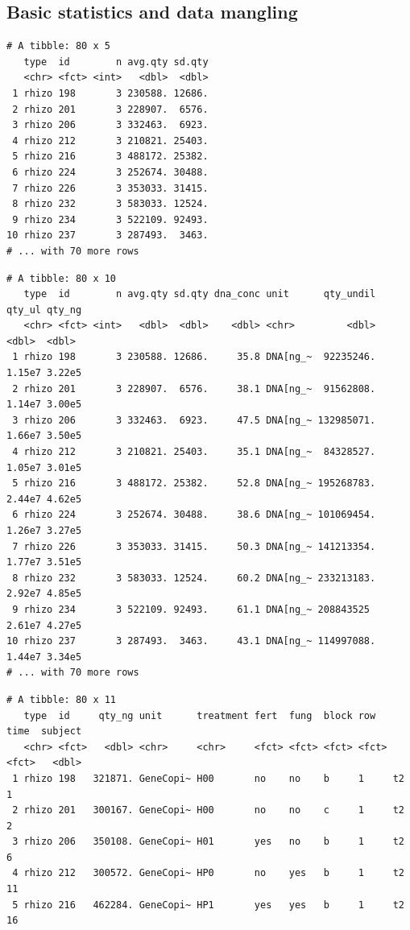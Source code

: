 \documentclass[twoside,12pt,final]{ucthesis-CA2012}
\begin{document}
\begin{ucmainmatter}
{\chapter{Basic statistics and data mangling}\label{basic-statistics-and-data-mangling}}
\begin{verbatim}
# A tibble: 80 x 5
   type  id        n avg.qty sd.qty
   <chr> <fct> <int>   <dbl>  <dbl>
 1 rhizo 198       3 230588. 12686.
 2 rhizo 201       3 228907.  6576.
 3 rhizo 206       3 332463.  6923.
 4 rhizo 212       3 210821. 25403.
 5 rhizo 216       3 488172. 25382.
 6 rhizo 224       3 252674. 30488.
 7 rhizo 226       3 353033. 31415.
 8 rhizo 232       3 583033. 12524.
 9 rhizo 234       3 522109. 92493.
10 rhizo 237       3 287493.  3463.
# ... with 70 more rows
\end{verbatim}
\begin{verbatim}
# A tibble: 80 x 10
   type  id        n avg.qty sd.qty dna_conc unit      qty_undil   qty_ul qty_ng
   <chr> <fct> <int>   <dbl>  <dbl>    <dbl> <chr>         <dbl>    <dbl>  <dbl>
 1 rhizo 198       3 230588. 12686.     35.8 DNA[ng_~  92235246.   1.15e7 3.22e5
 2 rhizo 201       3 228907.  6576.     38.1 DNA[ng_~  91562808.   1.14e7 3.00e5
 3 rhizo 206       3 332463.  6923.     47.5 DNA[ng_~ 132985071.   1.66e7 3.50e5
 4 rhizo 212       3 210821. 25403.     35.1 DNA[ng_~  84328527.   1.05e7 3.01e5
 5 rhizo 216       3 488172. 25382.     52.8 DNA[ng_~ 195268783.   2.44e7 4.62e5
 6 rhizo 224       3 252674. 30488.     38.6 DNA[ng_~ 101069454.   1.26e7 3.27e5
 7 rhizo 226       3 353033. 31415.     50.3 DNA[ng_~ 141213354.   1.77e7 3.51e5
 8 rhizo 232       3 583033. 12524.     60.2 DNA[ng_~ 233213183.   2.92e7 4.85e5
 9 rhizo 234       3 522109. 92493.     61.1 DNA[ng_~ 208843525    2.61e7 4.27e5
10 rhizo 237       3 287493.  3463.     43.1 DNA[ng_~ 114997088.   1.44e7 3.34e5
# ... with 70 more rows
\end{verbatim}
\begin{verbatim}
# A tibble: 80 x 11
   type  id     qty_ng unit      treatment fert  fung  block row   time  subject
   <chr> <fct>   <dbl> <chr>     <chr>     <fct> <fct> <fct> <fct> <fct>   <dbl>
 1 rhizo 198   321871. GeneCopi~ H00       no    no    b     1     t2          1
 2 rhizo 201   300167. GeneCopi~ H00       no    no    c     1     t2          2
 3 rhizo 206   350108. GeneCopi~ H01       yes   no    b     1     t2          6
 4 rhizo 212   300572. GeneCopi~ HP0       no    yes   b     1     t2         11
 5 rhizo 216   462284. GeneCopi~ HP1       yes   yes   b     1     t2         16

\end{verbatim}
\end{ucmainmatter}
\end{document}
